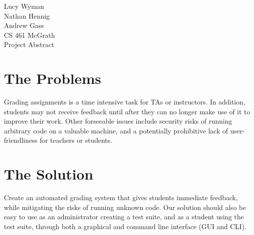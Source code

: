 \documentclass[12pt]{article}
\begin{document}
\noindent
Lucy Wyman\\
Nathan Hennig\\
Andrew Gass\\
CS 461 McGrath\\
Project Abstract\\

\section{The Problems}
	Grading assignments is a time intensive task for TAs or 
	instructors. In addition, students may not receive feedback
	until after they can no longer make use of it to improve their work.
    Other forseeable issues include security risks of running 
    arbitrary code on a valuable machine, and a potentially
    prohibitive lack of user-friendliness for teachers or 
    students.

\section{The Solution}
	Create an automated grading system that gives students immediate 
	feedback, while mitigating the risks of running unknown code.
    Our solution should also be easy to use as an administrator
    creating a test suite, and as a student using the test suite,
    through both a graphical and command line interface (GUI and CLI).
\end{document}
